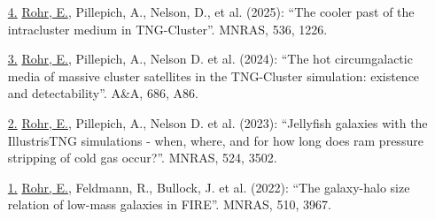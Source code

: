\documentclass[a4paper,12pt,oneside]{article}
\begin{document}
\begin{enumerate}[wide, labelwidth=!, labelindent=-11pt, parsep=0pt]
    \item[\href{https://ui.adsabs.harvard.edu/abs/2024MNRAS.tmp.2455R/abstract}{4.}] \underline{Rohr, E.}, Pillepich, A., Nelson, D., et al. (2025): ``The cooler past of the intracluster medium in TNG-Cluster''. MNRAS, 536, 1226.
    \item[\href{https://ui.adsabs.harvard.edu/abs/2024A\%26A...686A..86R/abstract}{3.}] \underline{Rohr, E.}, Pillepich, A., Nelson D. et al. (2024): ``The hot circumgalactic media of massive cluster satellites in the TNG-Cluster simulation: existence and detectability''. A\&A, 686, A86.
    \item[\href{https://ui.adsabs.harvard.edu/abs/2023MNRAS.524.3502R/abstract}{2.}] \underline{Rohr, E.}, Pillepich, A., Nelson D. et al. (2023): ``Jellyfish galaxies with the IllustrisTNG simulations - when, where, and for how long does ram pressure stripping of cold gas occur?''. MNRAS, 524, 3502.
    \item[\href{https://ui.adsabs.harvard.edu/abs/2022MNRAS.510.3967R/abstract}{1.}] \underline{Rohr, E.}, Feldmann, R., Bullock, J. et al. (2022): ``The galaxy-halo size relation of low-mass galaxies in FIRE''. MNRAS, 510, 3967.
\end{enumerate}
\end{document}
